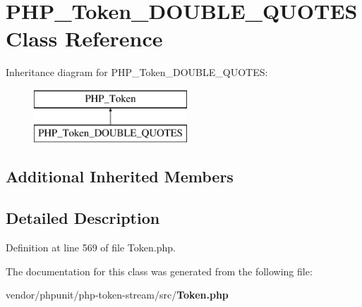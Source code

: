 \section{P\+H\+P\+\_\+\+Token\+\_\+\+D\+O\+U\+B\+L\+E\+\_\+\+Q\+U\+O\+T\+E\+S Class Reference}
\label{class_p_h_p___token___d_o_u_b_l_e___q_u_o_t_e_s}
Inheritance diagram for P\+H\+P\+\_\+\+Token\+\_\+\+D\+O\+U\+B\+L\+E\+\_\+\+Q\+U\+O\+T\+E\+S\+:\begin{figure}[H]
\begin{center}
\leavevmode
\includegraphics[height=2.000000cm]{class_p_h_p___token___d_o_u_b_l_e___q_u_o_t_e_s}
\end{center}
\end{figure}
\subsection*{Additional Inherited Members}


\subsection{Detailed Description}


Definition at line 569 of file Token.\+php.



The documentation for this class was generated from the following file\+:\begin{DoxyCompactItemize}
\item 
vendor/phpunit/php-\/token-\/stream/src/{\bf Token.\+php}\end{DoxyCompactItemize}
